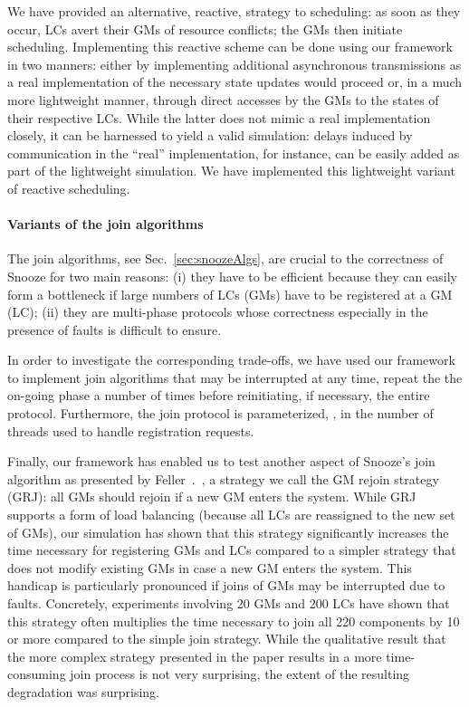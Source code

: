 We have provided an alternative, reactive, strategy to scheduling: as
soon as they occur, LCs avert their GMs of resource conflicts; the GMs
then initiate scheduling. Implementing this reactive scheme can be
done using our framework in two manners: either by implementing
additional asynchronous transmissions as a real implementation of the
necessary state updates would proceed or, in a much more lightweight
manner, through direct accesses by the GMs to the states of their
respective LCs. While the latter does not mimic a real implementation
closely, it can be harnessed to yield a valid simulation: delays
induced by communication in the ``real'' implementation, for instance,
can be easily added as part of the lightweight simulation. We have
implemented this lightweight variant of reactive scheduling.


\paragraph{Variants of the join algorithms}

The join algorithms, see Sec.~\ref{sec:snoozeAlgs}, are crucial to the
correctness of Snooze for two main reasons: (i) they have to be
efficient because they can easily form a bottleneck if large numbers
of LCs (GMs) have to be registered at a GM (LC); (ii) they are
multi-phase protocols whose correctness especially in the presence of
faults is difficult to ensure.

In order to investigate the corresponding trade-offs, we have used our
framework to implement join algorithms that may be interrupted at any
time, repeat the the on-going phase a number of times before
reinitiating, if necessary, the entire protocol. Furthermore, the join
protocol is parameterized, \eg, in the number of threads used to
handle registration requests.

Finally, our framework has enabled us to test another aspect of
Snooze's join algorithm as presented by
Feller~\etal.~\cite{feller:ccgrid12},
a strategy we call the GM rejoin
strategy (GRJ): all GMs should rejoin if a new GM enters the
system. While GRJ supports a form of load balancing (because all LCs
are reassigned to the new set of GMs), our simulation has shown that
this strategy significantly increases the time necessary for
registering GMs and LCs compared to a simpler strategy that does not
modify existing GMs in case a new GM enters the system. This handicap
is particularly pronounced if joins of GMs may be interrupted due to
faults. Concretely, experiments involving 20 GMs and 200 LCs have
shown that this strategy often multiplies the time necessary to join
all 220 components by 10 or more compared to the simple join
strategy. While the qualitative result that the more complex strategy
presented in the paper results in a more time-consuming join process
is not very surprising, the extent of the resulting degradation was
surprising.


